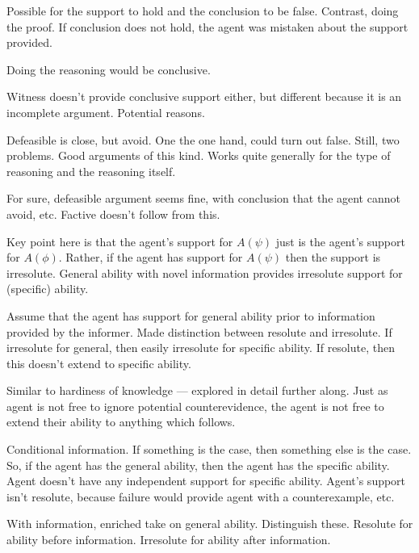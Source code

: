 \documentclass[10pt]{article}
\newcommand{\hozlinedash}[0]{%
  \noindent\hdashrule[0.5ex][c]{\textwidth}{.1pt}{2.5pt}
}
\begin{document}
\begin{note}
  \hozlinedash

  Possible for the support to hold and the conclusion to be false.
  Contrast, doing the proof.
  If conclusion does not hold, the agent was mistaken about the support provided.

  Doing the reasoning would be conclusive.

  Witness doesn't provide conclusive support either, but different because it is an incomplete argument.
  Potential reasons.

  Defeasible is close, but avoid.
  One the one hand, could turn out false.
  Still, two problems.
  Good arguments of this kind.
  Works quite generally for the type of reasoning and the reasoning itself.

  For sure, defeasible argument seems fine, with conclusion that the agent cannot avoid, etc.
  Factive doesn't follow from this.
\end{note}

\hozlinedash

\begin{note}
  {
    \color{red}
    Key point here is that the agent's support for \(A(\psi)\) just is the agent's support for \(A(\phi)\).
    Rather, if the agent has support for \(A(\psi)\) then the support is irresolute.
  }
  General ability with novel information provides irresolute support for (specific) ability.

  Assume that the agent has support for general ability prior to information provided by the informer.
  Made distinction between resolute and irresolute.
  If irresolute for general, then easily irresolute for specific ability.
  If resolute, then this doesn't extend to specific ability.

  {
    \color{red}
    Similar to hardiness of knowledge --- explored in detail further along.
    Just as agent is not free to ignore potential counterevidence, the agent is not free to extend their ability to anything which follows.
  }

  Conditional information.
  If something is the case, then something else is the case.
  So, if the agent has the general ability, then the agent has the specific ability.
  Agent doesn't have any independent support for specific ability.
  Agent's support isn't resolute, because failure would provide agent with a counterexample, etc.

  With information, enriched take on general ability.
  Distinguish these.
  Resolute for ability before information.
  Irresolute for ability after information.
\end{note}
\end{document}
